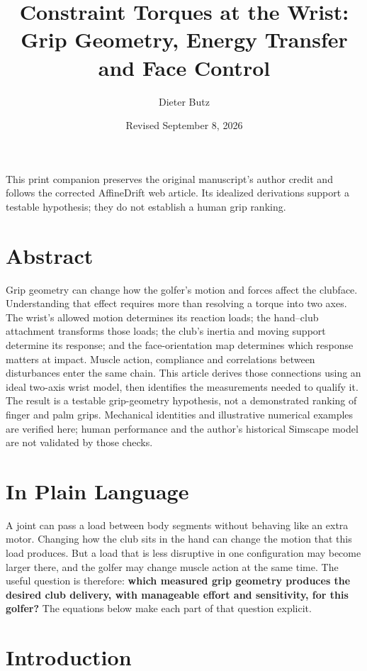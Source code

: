 \documentclass[
  11pt,
]{article}
\title{Constraint Torques at the Wrist: Grip Geometry, Energy Transfer
and Face Control}
\author{Dieter Butz}
\date{Revised September 8, 2026}
\begin{document}
\maketitle

{
\hypersetup{linkcolor=}
\setcounter{tocdepth}{2}
\tableofcontents
}
This print companion preserves the original manuscript's author credit
and follows the corrected AffineDrift web article. Its idealized
derivations support a testable hypothesis; they do not establish a human
grip ranking.

\section{Abstract}\label{abstract}

Grip geometry can change how the golfer's motion and forces affect the
clubface. Understanding that effect requires more than resolving a
torque into two axes. The wrist's allowed motion determines its reaction
loads; the hand--club attachment transforms those loads; the club's
inertia and moving support determine its response; and the
face-orientation map determines which response matters at impact. Muscle
action, compliance and correlations between disturbances enter the same
chain. This article derives those connections using an ideal two-axis
wrist model, then identifies the measurements needed to qualify it. The
result is a testable grip-geometry hypothesis, not a demonstrated
ranking of finger and palm grips. Mechanical identities and illustrative
numerical examples are verified here; human performance and the author's
historical Simscape model are not validated by those checks.

\section{In Plain Language}\label{in-plain-language}

A joint can pass a load between body segments without behaving like an
extra motor. Changing how the club sits in the hand can change the
motion that this load produces. But a load that is less disruptive in
one configuration may become larger there, and the golfer may change
muscle action at the same time. The useful question is therefore:
\textbf{which measured grip geometry produces the desired club delivery,
with manageable effort and sensitivity, for this golfer?} The equations
below make each part of that question explicit.

\section{Introduction}\label{introduction}
\end{document}
